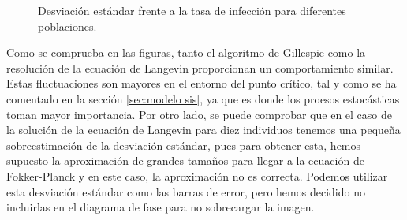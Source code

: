 \begin{figure}[H]
    \begin{center}
      \begin{subfigure}
          [Gillespie.]{
          \texttt{[image: sigma\_lambda.png]}
          \label{f:gillespie diagrama fase desviacion}}
      \end{subfigure}
  
      \vspace{0.5cm}
      
      \begin{subfigure}
          [Langevin.]{
          \texttt{[image: sigmalambdafocker.png]}
          \label{f:focker diagrama dase desviacion}}
      \end{subfigure}
      
      \caption{Desviación estándar frente a la tasa de infección para diferentes poblaciones.}
      \label{f:diagrama de fase desviación}  
    \end{center}    
\end{figure}


Como se comprueba en las figuras, tanto el algoritmo de Gillespie como la resolución de la ecuación de Langevin proporcionan un 
comportamiento similar. Estas fluctuaciones son mayores en el entorno del punto crítico, tal y como se ha comentado 
en la sección \ref{sec:modelo sis}, ya que es donde los proesos estocásticas toman mayor importancia. Por otro lado, se puede 
comprobar que en el caso de la solución de la ecuación de Langevin para diez individuos tenemos una pequeña sobreestimación de
la desviación estándar, pues para obtener esta, hemos supuesto la aproximación de grandes tamaños para llegar a la ecuación 
de Fokker-Planck y en este caso, la aproximación no es correcta. Podemos utilizar esta desviación estándar como las barras de error,
pero hemos decidido no incluirlas en el diagrama de fase para no sobrecargar la imagen.
